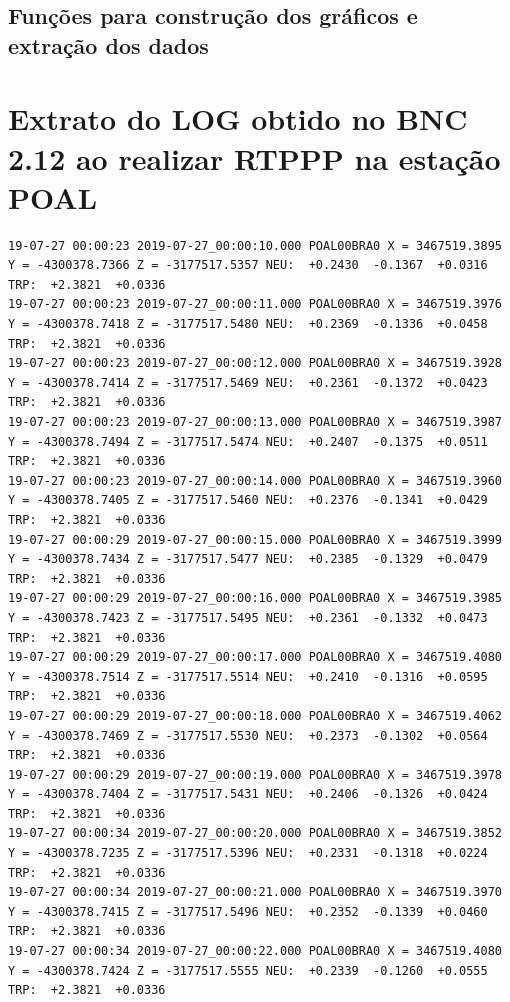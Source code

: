 \subsection{Funções para construção dos gráficos e extração dos dados}



\section{Extrato do LOG obtido no BNC 2.12 ao realizar RTPPP na estação POAL}

\begin{lstlisting}
19-07-27 00:00:23 2019-07-27_00:00:10.000 POAL00BRA0 X = 3467519.3895 Y = -4300378.7366 Z = -3177517.5357 NEU:  +0.2430  -0.1367  +0.0316 TRP:  +2.3821  +0.0336
19-07-27 00:00:23 2019-07-27_00:00:11.000 POAL00BRA0 X = 3467519.3976 Y = -4300378.7418 Z = -3177517.5480 NEU:  +0.2369  -0.1336  +0.0458 TRP:  +2.3821  +0.0336
19-07-27 00:00:23 2019-07-27_00:00:12.000 POAL00BRA0 X = 3467519.3928 Y = -4300378.7414 Z = -3177517.5469 NEU:  +0.2361  -0.1372  +0.0423 TRP:  +2.3821  +0.0336
19-07-27 00:00:23 2019-07-27_00:00:13.000 POAL00BRA0 X = 3467519.3987 Y = -4300378.7494 Z = -3177517.5474 NEU:  +0.2407  -0.1375  +0.0511 TRP:  +2.3821  +0.0336
19-07-27 00:00:23 2019-07-27_00:00:14.000 POAL00BRA0 X = 3467519.3960 Y = -4300378.7405 Z = -3177517.5460 NEU:  +0.2376  -0.1341  +0.0429 TRP:  +2.3821  +0.0336
19-07-27 00:00:29 2019-07-27_00:00:15.000 POAL00BRA0 X = 3467519.3999 Y = -4300378.7434 Z = -3177517.5477 NEU:  +0.2385  -0.1329  +0.0479 TRP:  +2.3821  +0.0336
19-07-27 00:00:29 2019-07-27_00:00:16.000 POAL00BRA0 X = 3467519.3985 Y = -4300378.7423 Z = -3177517.5495 NEU:  +0.2361  -0.1332  +0.0473 TRP:  +2.3821  +0.0336
19-07-27 00:00:29 2019-07-27_00:00:17.000 POAL00BRA0 X = 3467519.4080 Y = -4300378.7514 Z = -3177517.5514 NEU:  +0.2410  -0.1316  +0.0595 TRP:  +2.3821  +0.0336
19-07-27 00:00:29 2019-07-27_00:00:18.000 POAL00BRA0 X = 3467519.4062 Y = -4300378.7469 Z = -3177517.5530 NEU:  +0.2373  -0.1302  +0.0564 TRP:  +2.3821  +0.0336
19-07-27 00:00:29 2019-07-27_00:00:19.000 POAL00BRA0 X = 3467519.3978 Y = -4300378.7404 Z = -3177517.5431 NEU:  +0.2406  -0.1326  +0.0424 TRP:  +2.3821  +0.0336
19-07-27 00:00:34 2019-07-27_00:00:20.000 POAL00BRA0 X = 3467519.3852 Y = -4300378.7235 Z = -3177517.5396 NEU:  +0.2331  -0.1318  +0.0224 TRP:  +2.3821  +0.0336
19-07-27 00:00:34 2019-07-27_00:00:21.000 POAL00BRA0 X = 3467519.3970 Y = -4300378.7415 Z = -3177517.5496 NEU:  +0.2352  -0.1339  +0.0460 TRP:  +2.3821  +0.0336
19-07-27 00:00:34 2019-07-27_00:00:22.000 POAL00BRA0 X = 3467519.4080 Y = -4300378.7424 Z = -3177517.5555 NEU:  +0.2339  -0.1260  +0.0555 TRP:  +2.3821  +0.0336

\end{lstlisting}
